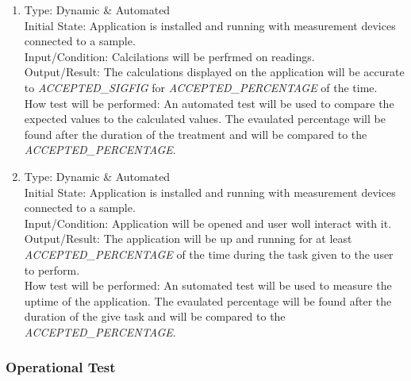 \documentclass[12pt, titlepage]{article}
\begin{document}
\begin{adjustwidth}{2.2em}{0pt}
\begin{enumerate}[{NF-PT}1.]
  \item Type: Dynamic \& Automated\\
  Initial State: Application is installed and running with measurement devices connected to a sample.\\
  Input/Condition: Calcilations will be perfrmed on readings.\\
  Output/Result: The calculations displayed on the application will be accurate to \textsl{ACCEPTED\_SIGFIG} for  \textsl{ACCEPTED\_PERCENTAGE
  } of the time.\\
  How test will be performed: An automated test will be used to compare the expected values to the calculated values. The evaulated percentage will be found after the duration of the treatment and will be compared to the \textsl{ACCEPTED\_PERCENTAGE}.

  \item Type: Dynamic \& Automated\\
  Initial State: Application is installed and running with measurement devices connected to a sample.\\
  Input/Condition: Application will be opened and user woll interact with it.\\
  Output/Result: The application will be up and running for at least \textsl{ACCEPTED\_PERCENTAGE} of the time during the task given to the user to perform.\\
  How test will be performed: An sutomated test will be used to measure the uptime of the application. The evaulated percentage will be found after the duration of the give task and will be compared to the \textsl{ACCEPTED\_PERCENTAGE}.

\end{enumerate}
\end{adjustwidth}

\subsubsection{Operational Test}
\end{document}
